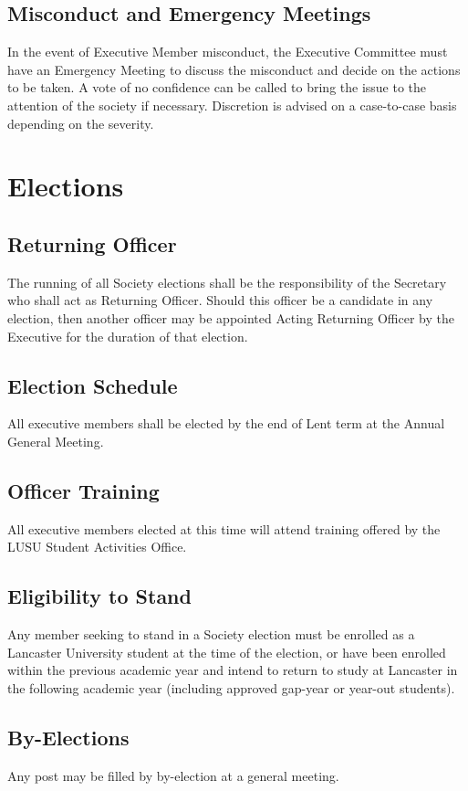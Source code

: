 \documentclass[11pt,a4paper]{article}
\begin{document}
\subsection{Misconduct and Emergency Meetings}
In the event of Executive Member misconduct, the Executive Committee must have an Emergency Meeting to discuss the misconduct and decide on the actions to be taken. A vote of no confidence can be called to bring the issue to the attention of the society if necessary. Discretion is advised on a case-to-case basis depending on the severity.

\section{Elections}\label{sec:elections}
\subsection{Returning Officer}
The running of all Society elections shall be the responsibility of the Secretary who shall act as Returning Officer. Should this officer be a candidate in any election, then another officer may be appointed Acting Returning Officer by the Executive for the duration of that election. 

\subsection{Election Schedule}
All executive members shall be elected by the end of Lent term at the Annual General Meeting.

\subsection{Officer Training}
All executive members elected at this time will attend training offered by the LUSU Student Activities Office.

\subsection{Eligibility to Stand}
Any member seeking to stand in a Society election must be enrolled as a Lancaster University student at the time of the election, or have been enrolled within the previous academic year and intend to return to study at Lancaster in the following academic year (including approved gap-year or year-out students).

\subsection{By-Elections}
Any post may be filled by by-election at a general meeting.
\end{document}
